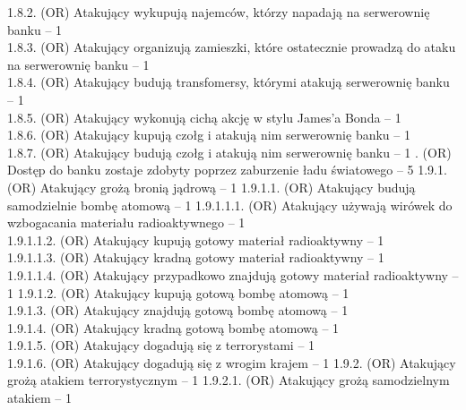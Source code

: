 \documentclass[10pt,a4paper,twoside]{article}
\newenvironment{subs}
{\adjustwidth{3em}{0pt}}
{\endadjustwidth}
\begin{document}
\begin{subs}
\begin{subs}
            1.8.2. (OR) Atakujący wykupują najemców, którzy napadają na serwerownię banku -- 1 \\
            1.8.3. (OR) Atakujący organizują zamieszki, które ostatecznie prowadzą do ataku na serwerownię banku -- 1 \\
            1.8.4. (OR) Atakujący budują transfomersy, którymi atakują serwerownię banku -- 1 \\
            1.8.5. (OR) Atakujący wykonują cichą akcję w stylu James'a Bonda -- 1 \\
            1.8.6. (OR) Atakujący kupują czołg i atakują nim serwerownię banku -- 1 \\
            1.8.7. (OR) Atakujący budują czołg i atakują nim serwerownię banku -- 1
        \end{subs}
        1.9. (OR) Dostęp do banku zostaje zdobyty poprzez zaburzenie ładu światowego -- 5
        \begin{subs}
            1.9.1. (OR) Atakujący grożą bronią jądrową -- 1
            \begin{subs}
                1.9.1.1. (OR) Atakujący budują samodzielnie bombę atomową -- 1
                \begin{subs}
                    1.9.1.1.1. (OR) Atakujący używają wirówek do wzbogacania materiału radioaktywnego -- 1 \\
                    1.9.1.1.2. (OR) Atakujący kupują gotowy materiał radioaktywny -- 1 \\
                    1.9.1.1.3. (OR) Atakujący kradną gotowy materiał radioaktywny -- 1 \\
                    1.9.1.1.4. (OR) Atakujący przypadkowo znajdują gotowy materiał radioaktywny -- 1
                \end{subs}
                1.9.1.2. (OR) Atakujący kupują gotową bombę atomową -- 1 \\
                1.9.1.3. (OR) Atakujący znajdują gotową bombę atomową -- 1 \\
                1.9.1.4. (OR) Atakujący kradną gotową bombę atomową -- 1 \\
                1.9.1.5. (OR) Atakujący dogadują się z terrorystami -- 1 \\
                1.9.1.6. (OR) Atakujący dogadują się z wrogim krajem -- 1
            \end{subs}
            1.9.2. (OR) Atakujący grożą atakiem terrorystycznym -- 1
            \begin{subs}
                1.9.2.1. (OR) Atakujący grożą samodzielnym atakiem -- 1

\end{subs}
\end{subs}
\end{subs}
\end{document}
